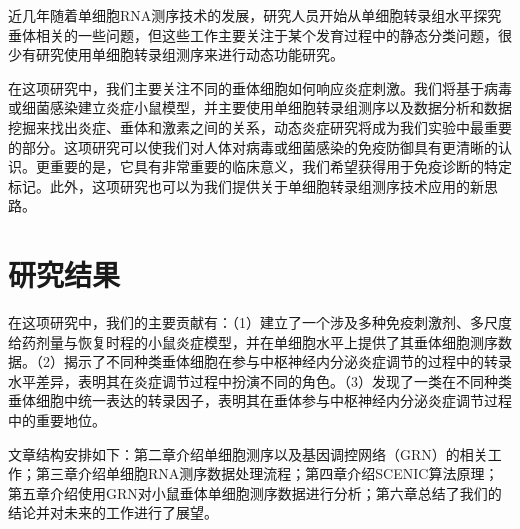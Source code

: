   近几年随着单细胞RNA测序技术的发展\cite{svensson2018exponential}，研究人员开始从单细胞转录组水平探究垂体相关的一些问题\cite{chen2020single,cheung2018single,ho2020single,fletcher2019cell}，但这些工作主要关注于某个发育过程中的静态分类问题，很少有研究使用单细胞转录组测序来进行动态功能研究。

  在这项研究中，我们主要关注不同的垂体细胞如何响应炎症刺激。我们将基于病毒或细菌感染建立炎症小鼠模型，并主要使用单细胞转录组测序以及数据分析和数据挖掘来找出炎症、垂体和激素之间的关系，动态炎症研究将成为我们实验中最重要的部分。这项研究可以使我们对人体对病毒或细菌感染的免疫防御具有更清晰的认识。更重要的是，它具有非常重要的临床意义，我们希望获得用于免疫诊断的特定标记。此外，这项研究也可以为我们提供关于单细胞转录组测序技术应用的新思路。

\section{研究结果}
  在这项研究中，我们的主要贡献有：（1）建立了一个涉及多种免疫刺激剂、多尺度给药剂量与恢复时程的小鼠炎症模型，并在单细胞水平上提供了其垂体细胞测序数据。（2）揭示了不同种类垂体细胞在参与中枢神经内分泌炎症调节的过程中的转录水平差异，表明其在炎症调节过程中扮演不同的角色。（3）发现了一类在不同种类垂体细胞中统一表达的转录因子，表明其在垂体参与中枢神经内分泌炎症调节过程中的重要地位。

  文章结构安排如下：第二章介绍单细胞测序以及基因调控网络（GRN）的相关工作；第三章介绍单细胞RNA测序数据处理流程；第四章介绍SCENIC算法原理；第五章介绍使用GRN对小鼠垂体单细胞测序数据进行分析；第六章总结了我们的结论并对未来的工作进行了展望。

